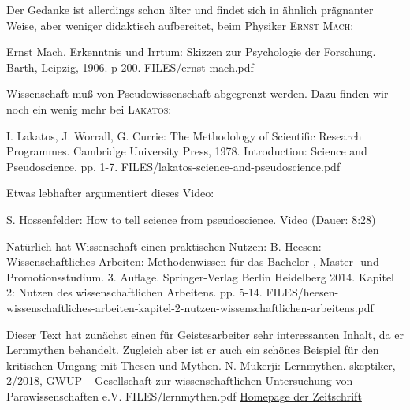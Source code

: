 Der Gedanke ist allerdings schon älter und findet sich in ähnlich prägnanter Weise,
aber weniger didaktisch aufbereitet, beim Physiker \textsc{Ernst Mach}:


{Ernst Mach. Erkenntnis und Irrtum: Skizzen zur Psychologie der Forschung. Barth, Leipzig, 1906. p 200.}
{FILES/ernst-mach.pdf}
{}


Wissenschaft muß von Pseudowissenschaft abgegrenzt werden. Dazu finden wir noch ein wenig
mehr bei \textsc{Lakatos}:

{I. Lakatos, J. Worrall, G. Currie: The Methodology of Scientific Research Programmes.
Cambridge University Press, 1978.
Introduction: Science and Pseudoscience. pp. 1-7.}
{FILES/lakatos-science-and-pseudoscience.pdf}
{}

Etwas lebhafter argumentiert dieses Video:

{S. Hossenfelder: How to tell science from pseudoscience.}
{}
{\href{http://backreaction.blogspot.com/2020/06/how-to-tell-science-from-pseudoscience.html}{Video (Dauer: 8:28)}}


Natürlich hat Wissenschaft einen praktischen Nutzen:
{B. Heesen: Wissenschaftliches Arbeiten: Methodenwissen für das Bachelor-, Master- und Promotionsstudium.
3. Auflage. Springer-Verlag Berlin Heidelberg 2014. 
Kapitel 2: Nutzen des wissenschaftlichen Arbeitens.
pp. 5-14.}
{FILES/heesen-wissenschaftliches-arbeiten-kapitel-2-nutzen-wissenschaftlichen-arbeitens.pdf}
{}

Dieser Text hat zunächst einen für Geistesarbeiter sehr interessanten Inhalt, da
er Lernmythen behandelt. Zugleich aber ist er auch ein schönes Beispiel für den
kritischen Umgang mit Thesen und Mythen.
{N. Mukerji: Lernmythen. skeptiker, 2/2018, GWUP -- Gesellschaft zur wissenschaftlichen Untersuchung von Parawissenschaften e.V.}
{FILES/lernmythen.pdf}
{\href{https://www.gwup.org/zeitschrift-skeptiker}{Homepage der Zeitschrift}}





